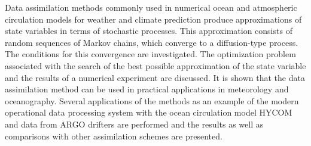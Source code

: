 \def\leftkol{ENGLISH ABSTRACTS}

\def\rightkol{ENGLISH ABSTRACTS}

\titele{\tit}{\aut}{\auf}{\leftkol}{\rightkol}


\noindent 
Data assimilation methods commonly used in numerical ocean and atmospheric 
circulation models for weather and climate prediction produce approximations of state 
variables in terms of stochastic processes. This approximation consists of random sequences 
of Markov chains, which converge to a diffusion-type process. The conditions for this 
convergence are investigated. The optimization problem associated with the search of the 
best possible approximation of the state variable and the results of a numerical experiment 
are discussed. It is shown that the data assimilation method can be used in practical 
applications in meteorology and oceanography. Several applications of the methods as an 
example of the modern operational data processing system with the ocean circulation model 
HYCOM and data from ARGO drifters are performed and the results as well as comparisons with 
other assimilation schemes are presented.





  
\def\tit{COMPLETE CONVERGENCE FOR~ARRAYS OF~NEGATIVELY DEPENDENT RANDOM VARIABLES}

\def\aut{S.\,H.~Sung$^1$, K.~Budsaba$^{2}$, and~A.~Volodin$^{3}$}

\def\auf{$^1$Department of Applied Mathematics, Pai Chai University, Taejon, South Korea, 
sungsh@pcu.ac.kr\\[1pt]
$^2$Center of Excellence in Mathematics, CHE, Bangkok, Thailand;
Department of Mathematics and Statistics,\\
$\hphantom{^1}$Thammasat University Rangsit Center, 
Pathumthani, Thailand, kamon@mathstat.sci.tu.ac.th\\[1pt]
$^3$School of Mathematics and Statistics, University of Western Australia, 
Crawley, Australia; University of Regina,\\
$\hphantom{^1}$Canada, 
Andrei.Volodin@uregina.ca}

